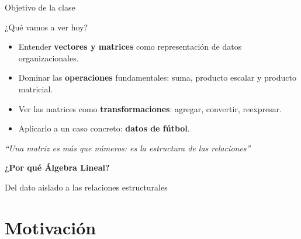 \documentclass[aspectratio=169,10pt]{beamer}
\begin{document}
\begin{frame}{Objetivo de la clase}
\begin{block}{¿Qué vamos a ver hoy?}
\begin{itemize}
    \item Entender \textbf{vectores y matrices} como representación de datos organizacionales.
    \item Dominar las \textbf{operaciones} fundamentales: suma, producto escalar y producto matricial.
    \item Ver las matrices como \textbf{transformaciones}: agregar, convertir, reexpresar.
    \item Aplicarlo a un caso concreto: \textbf{datos de fútbol}.
\end{itemize}
\end{block}
\vspace{0.3cm}
\begin{center}
\textit{``Una matriz es más que números: es la estructura de las relaciones''}
\end{center}
\end{frame}

\begin{frame}
\begin{center}
\vspace{1.5cm}
\Huge \textbf{¿Por qué Álgebra Lineal?}

\vspace{0.5cm}
\Large Del dato aislado a las relaciones estructurales
\end{center}
\end{frame}

\section{Motivación}
\end{document}
